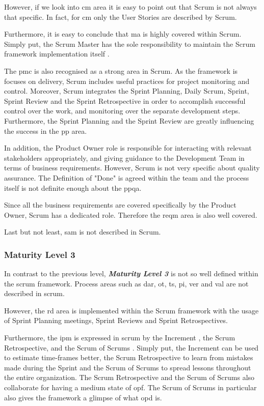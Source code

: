 However, if we look into \ac{cm} area it is easy to point out that Scrum is not always that specific. In fact, for \ac{cm} only the User Stories are described by Scrum. 

Furthermore, it is easy to conclude that \ac{ma} is highly covered within Scrum. Simply put, the Scrum Master has the sole responsibility to maintain the Scrum framework implementation itself \citep{schwaber2011scrum}. 

The \ac{pmc} is also recognised as a strong area in Scrum. As the framework is focuses on delivery, Scrum includes useful practices for project monitoring and control. Moreover, Scrum integrates the Sprint Planning, Daily Scrum, Sprint, Sprint Review and the Sprint Retrospective in order to accomplish successful control over the work, and monitoring over the separate development steps. Furthermore, the Sprint Planning and the Sprint Review are greatly influencing the success in the \ac{pp} area. 

In addition, the Product Owner role is responsible for interacting with relevant stakeholders appropriately, and giving guidance to the Development Team in terms of business requirements. However, Scrum is not very specific about quality assurance. The Definition of "Done" is agreed within the team and the process itself is not definite enough about the \ac{ppqa}. 

Since all the business requirements are covered specifically by the Product Owner, Scrum has a dedicated role. Therefore the \ac{reqm} area is also well covered. 

Last but not least, \ac{sam} is not described in Scrum.

\subsubsection{Maturity Level 3}
In contrast to the previous level, \textbf{\textit{Maturity Level 3}} is not so well defined within the \ac{scrum} framework. Process areas such as \ac{dar}, \ac{ot}, \ac{ts}, \ac{pi}, \ac{ver} and \ac{val} are not described in \ac{scrum}.

However, the \ac{rd} area is implemented within the Scrum framework with the usage of Sprint Planning meetings, Sprint Reviews and Sprint Retrospectives.

Furthermore, the \ac{ipm} is expressed in \ac{scrum} by the Increment \citep{schwaber2011scrum}, the Scrum Retrospective, and the Scrum of Scrums \citep{sutherland2001inventing}. Simply put, the Increment can be used to estimate time-frames better, the Scrum Retrospective to learn from mistakes made during the Sprint and the Scrum of Scrums to spread lessons throughout the entire organization. The Scrum Retrospective and the Scrum of Scrums also collaborate for having a medium state of \ac{opf}. The Scrum of Scrums in particular also gives the framework a glimpse of what \ac{opd} is.

